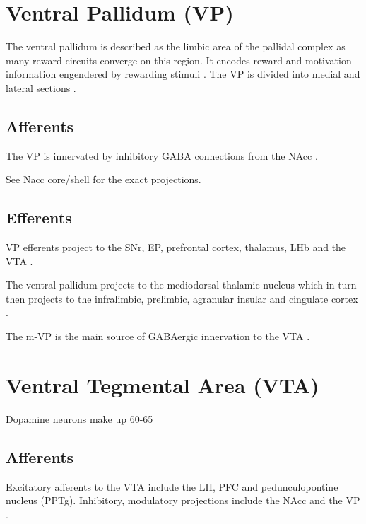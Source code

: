 \documentclass[12pt,a4paper]{article}
\begin{document}
\section{Ventral Pallidum (VP)}

The ventral pallidum is described as the limbic area of the pallidal complex as
many reward circuits converge on this region. It encodes reward and motivation
information engendered by rewarding stimuli \citep{Smith2009}. The VP is divided into medial
and lateral sections \citep{Sesack2010}.

\subsection{Afferents}

The VP is innervated by inhibitory GABA connections from the
NAcc \citep{Basar2010}. 

See Nacc core/shell for the exact projections.

\subsection{Efferents}

VP efferents project to the SNr, EP, prefrontal cortex, thalamus, LHb and the VTA \citep{Groenewegen1993} \citep{Ikemoto2007}.

The ventral pallidum projects to the mediodorsal thalamic nucleus which in turn then 
projects to the infralimbic, prelimbic, agranular insular and cingulate cortex \citep{Ikemoto2007}.

The m-VP is the main source of GABAergic innervation to the VTA \citep{Sesack2010}.


\section{Ventral Tegmental Area (VTA)}

Dopamine neurons make up 60-65%

\subsection{Afferents}

Excitatory afferents to the VTA include the LH, PFC and pedunculopontine nucleus
(PPTg). Inhibitory, modulatory projections include the NAcc and the VP \citep{Sesack2010}.
\end{document}
